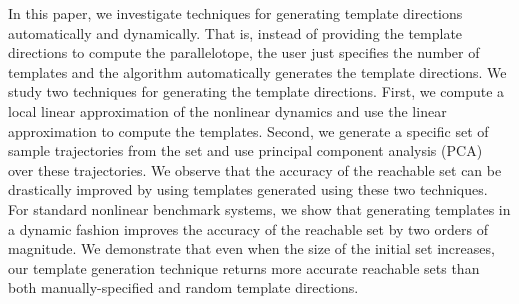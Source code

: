 In this paper, we investigate techniques for generating template directions automatically and dynamically.
%
That is, instead of providing the template directions to compute the parallelotope, the user just specifies the number of templates and the algorithm automatically generates the template directions.
%
We study two techniques for generating the template directions.
%
First, we compute a local linear approximation of the nonlinear dynamics and use the linear approximation to compute the templates.
%
Second, we generate a specific set of sample trajectories from the set and use principal component analysis (PCA) over these trajectories.
%
We observe that the accuracy of the reachable set can be drastically improved by using templates generated using these two techniques.
%
For standard nonlinear benchmark systems, we show that generating templates in a dynamic fashion improves the accuracy of the reachable set by two orders of magnitude.
%
We demonstrate that even when the size of the initial set increases, our template generation technique returns more accurate reachable sets than both manually-specified and random template directions.




